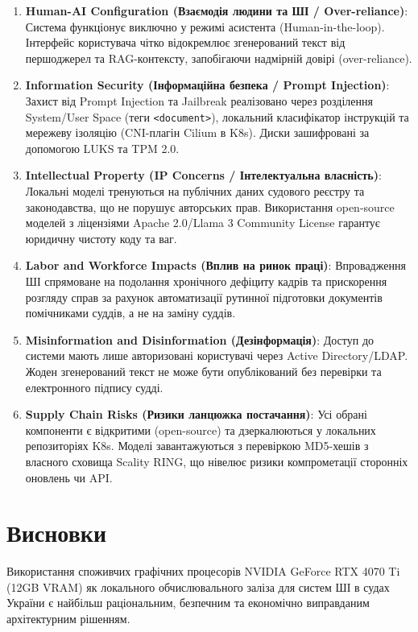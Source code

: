 \documentclass{article}
\begin{document}
\begin{enumerate}
\item \textbf{Human-AI Configuration (Взаємодія людини та ШІ / Over-reliance)}: Система функціонує виключно у режимі асистента (Human-in-the-loop). Інтерфейс користувача чітко відокремлює згенерований текст від першоджерел та RAG-контексту, запобігаючи надмірній довірі (over-reliance).
\item \textbf{Information Security (Інформаційна безпека / Prompt Injection)}: Захист від Prompt Injection та Jailbreak реалізовано через розділення System/User Space (теги \texttt{<document>}), локальний класифікатор інструкцій та мережеву ізоляцію (CNI-плагін Cilium в K8s). Диски зашифровані за допомогою LUKS та TPM 2.0.
\item \textbf{Intellectual Property (IP Concerns / Інтелектуальна власність)}: Локальні моделі тренуються на публічних даних судового реєстру та законодавства, що не порушує авторських прав. Використання open-source моделей з ліцензіями Apache 2.0/Llama 3 Community License гарантує юридичну чистоту коду та ваг.
\item \textbf{Labor and Workforce Impacts (Вплив на ринок праці)}: Впровадження ШІ спрямоване на подолання хронічного дефіциту кадрів та прискорення розгляду справ за рахунок автоматизації рутинної підготовки документів помічниками суддів, а не на заміну суддів.
\item \textbf{Misinformation and Disinformation (Дезінформація)}: Доступ до системи мають лише авторизовані користувачі через Active Directory/LDAP. Жоден згенерований текст не може бути опублікований без перевірки та електронного підпису судді.
\item \textbf{Supply Chain Risks (Ризики ланцюжка постачання)}: Усі обрані компоненти є відкритими (open-source) та дзеркалюються у локальних репозиторіях K8s. Моделі завантажуються з перевіркою MD5-хешів з власного сховища Scality RING, що нівелює ризики компрометації сторонніх оновлень чи API.
\end{enumerate}

\section{Висновки}
Використання споживчих графічних процесорів NVIDIA GeForce RTX 4070 Ti (12GB VRAM) як локального обчислювального заліза для систем ШІ в судах України є найбільш раціональним, безпечним та економічно виправданим архітектурним рішенням.
\end{document}
